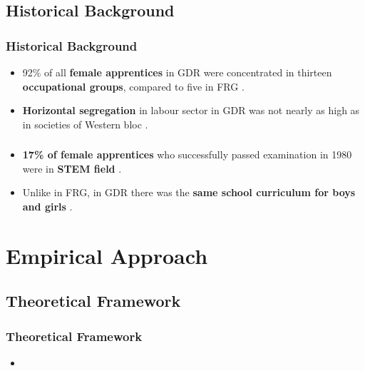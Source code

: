 \documentclass[11pt, aspectratio=1610, xcolor={dvipsnames}]{beamer}
\newcommand{\highlight}[1]{\textbf{\textcolor{PineGreen}{#1}}}
\begin{document}
	\subsection{Historical Background}
	\begin{frame}
		\frametitle{Historical Background}
		
		\begin{itemize}
			\item 92\% of all \highlight{female apprentices} in GDR were concentrated in thirteen \highlight{occupational groups}, compared to five in FRG \textcolor{darkgray}{\citep{Menschik1974}}.
			\item \highlight{Horizontal segregation} in labour sector in GDR was not nearly as high as in societies of Western bloc \textcolor{darkgray}{\citep{Lane1983}}.
		\end{itemize}
		
	\end{frame}
	
	\begin{frame}
		\frametitle{}
		
		\begin{itemize}
			\item \highlight{17\% of female apprentices} who successfully passed examination in 1980 were in \highlight{STEM field} \textcolor{darkgray}{\citep[p. 293]{DDRJahrbuch1981}}.
			\item Unlike in FRG, in GDR there was the \highlight{same school curriculum for boys and girls} \textcolor{darkgray}{\citep{FuchsSchuendeln2016, Lippmann2018}}.
		\end{itemize}
		
	\end{frame}
	
	\section{Empirical Approach}
	
	\subsection{Theoretical Framework}
	\begin{frame}
		\frametitle{Theoretical Framework}
		
		\begin{itemize}
			\item \cite{Fernandez2011}
		\end{itemize}
		
	\end{frame}
	
\end{document}
